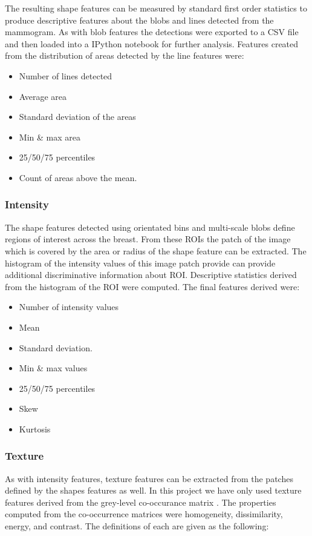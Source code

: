 The resulting shape features can be measured by standard first order statistics to produce descriptive features about the blobs and lines detected from the mammogram. As with blob features the detections were exported to a CSV file and then loaded into a IPython notebook for further analysis. Features created from the distribution of areas detected by the line features were:

\begin{itemize}
	\item Number of lines detected
	\item Average area
	\item Standard deviation of the areas
	\item Min \& max area
	\item 25/50/75 percentiles
	\item Count of areas above the mean.
\end{itemize}

\subsubsection{Intensity}
The shape features detected using orientated bins and multi-scale blobs define regions of interest across the breast. From these ROIs the patch of the image which is covered by the area or radius of the shape feature can be extracted. The histogram of the intensity values of this image patch provide can provide additional discriminative information about ROI. Descriptive statistics derived from the histogram of the ROI were computed. The final features derived were:

\begin{itemize}
	\item Number of intensity values
	\item Mean
	\item Standard deviation.
	\item Min \& max values
	\item 25/50/75 percentiles
	\item Skew
	\item Kurtosis
\end{itemize}

\subsubsection{Texture}
As with intensity features, texture features can be extracted from the patches defined by the shapes features as well. In this project we have only used texture features derived from the grey-level co-occurance matrix \cite{haralick1973textural}. The properties computed from the co-occurrence matrices were homogeneity, dissimilarity, energy, and contrast. The definitions of each are given as the following:

